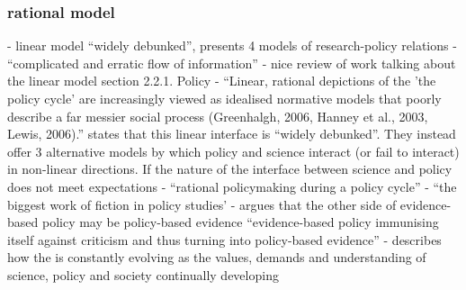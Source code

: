 

\subsubsection{rational model}
\cite{BoswellS2017} - linear model ``widely debunked'', presents 4 models of research-policy relations
\cite{BednarekSHG2015} - ``complicated and erratic flow of information''
\cite{McNie2007} - nice review of work talking about the linear model section 2.2.1. Policy
\cite{HaynesDCRHGS2011} - ``Linear, rational depictions of the 'the policy cycle' are increasingly viewed as idealised normative models that poorly describe a far messier social process (Greenhalgh, 2006, Hanney et al., 2003, Lewis, 2006).''
\textcite{BoswellS2017} states that this linear  interface is ``widely debunked''. They instead offer 3 alternative models by which policy and science interact (or fail to interact) in non-linear directions. If the nature of the interface between science and policy does not meet expectations 
\cite{Cairney2018} - ``rational policymaking during a policy cycle'' - ``the biggest work of fiction in policy studies'
\cite{StrassheimK2014} - argues that the other side of evidence-based policy may be policy-based evidence ``evidence-based policy immunising itself against criticism and thus turning into policy-based evidence''
\cite{Obermeister2020} - describes how the \SPI{} is constantly evolving as the values, demands and understanding of science, policy and society continually developing

